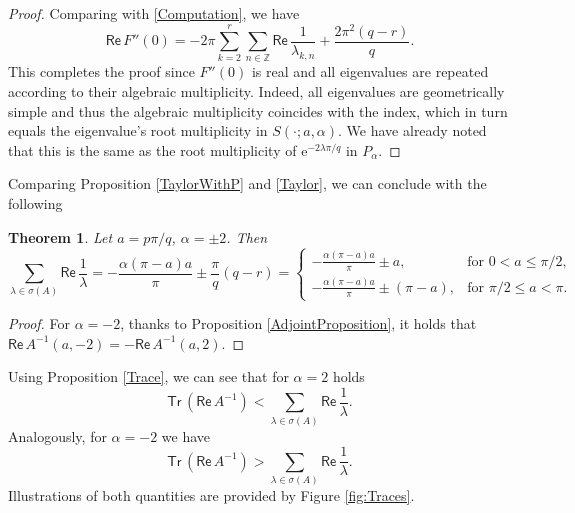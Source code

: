 \documentclass[11pt, a4paper,reqno]{amsart}
\theoremstyle{plain}
\newtheorem{theorem}{{Theorem}}[section]
\theoremstyle{definition}
\theoremstyle{remark}
\renewcommand{\leq}{\leqslant}	\renewcommand{\geq}{\geqslant}
\newcommand{\1}{\mathds 1}
\renewcommand{\Re}{\mathsf{Re}\,}
\newcommand{\Tr}{\mathsf{Tr}\,}
\begin{document}
\begin{proof}
Comparing with \eqref{Computation}, we have
\[
\Re F''(0) = -2\pi \sum_{k=2}^r\sum_{n\in \mathbb Z}\Re \frac{1}{\lambda_{k,n}} + \frac{2\pi^2(q-r)}{q}.
\]
This completes the proof since $F''(0)$ is real and all eigenvalues are repeated according to their algebraic multiplicity. Indeed, all eigenvalues are geometrically simple and thus the algebraic multiplicity coincides with the index, which in turn equals the eigenvalue's root multiplicity in $S(\cdot; a, \alpha)$. We have already noted that this is the same as the root multiplicity of $\mathrm{e}^{-2\lambda\pi/q}$ in $P_\alpha$.
\end{proof}

Comparing Proposition \ref{TaylorWithP} and \eqref{Taylor}, we can conclude with the following
\begin{theorem}\label{SpectralTrace}
    Let $a = p\pi/q$, $\alpha= \pm 2$. Then
    \[
    \sum_{\lambda \in \sigma(A)}\Re \frac{1}{\lambda} = - \frac{\alpha(\pi-a)a}{\pi} \pm \frac{\pi}{q}(q-r) = \begin{cases}
        -\frac{\alpha(\pi-a)a}{\pi} \pm a, & \text{for } 0 < a \leq \pi/2, \\
        -\frac{\alpha(\pi-a)a}{\pi} \pm (\pi-a), & \text{for } \pi/2 \leq a < \pi.
    \end{cases}
    \]
\end{theorem}
\begin{proof}
    For $\alpha = -2$, thanks to Proposition \ref{AdjointProposition}, it holds that $\Re A^{-1}(a, -2) = -\Re A^{-1}(a, 2)$.
\end{proof}

Using Proposition \ref{Trace}, we can see that for $\alpha = 2$ holds
\[
\Tr\left(\Re A^{-1}\right) < \sum_{\lambda \in \sigma (A)} \Re \frac{1}{\lambda}.
\]
Analogously, for $\alpha = -2$ we have
\[
\Tr\left(\Re A^{-1}\right) > \sum_{\lambda \in \sigma (A)} \Re \frac{1}{\lambda}.
\]
Illustrations of both quantities are provided by Figure \ref{fig:Traces}.
\end{document}
